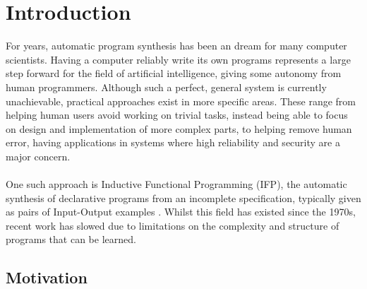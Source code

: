\chapter{Introduction}
For years, automatic program synthesis has been an dream for many computer scientists. Having a computer reliably write its own programs represents a large step forward for the field of artificial intelligence, giving some autonomy from human programmers. Although such a perfect, general system is currently unachievable, practical approaches exist in more specific areas. These range from helping human users avoid working on trivial tasks, instead being able to focus on design and implementation of more complex parts, to helping remove human error, having applications in systems where high reliability and security are a major concern. \\ \\ 
One such approach is Inductive Functional Programming (IFP), the automatic synthesis of declarative programs from an incomplete specification, typically given as pairs of Input-Output examples \cite{IFPnotes}. Whilst this field has existed since the 1970s, recent work has slowed due to limitations on the complexity and structure of programs that can be learned. 

\section{Motivation}

